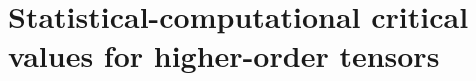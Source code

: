 \documentclass[lettersize,onecolumn,journal]{IEEEtran}
\theoremstyle{definition}
\theoremstyle{definition}
\newtheorem{rmk}{Remark}
\newcommand{\of}[1]{\left(#1\right)}
\begin{document}
\section{Statistical-computational critical values for higher-order tensors}\label{sec:limits}




\end{document}
